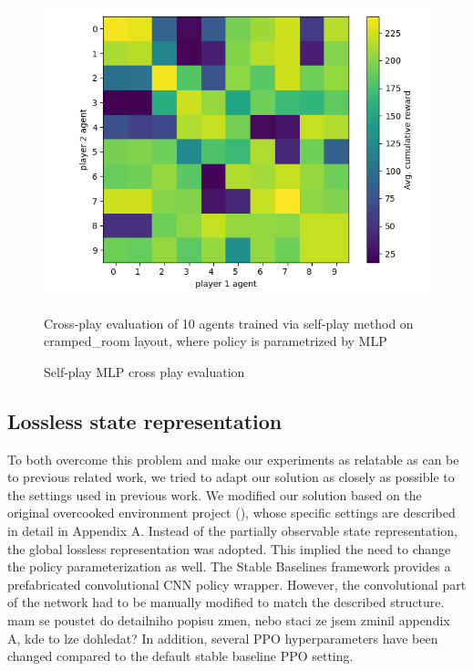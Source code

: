 \begin{figure}[!ht]
    \centering
    \includegraphics*[width=13cm]{../img/MLP_OFF_DIAG_TEST.png}
    \caption{Self-play MLP cross play evaluation}
    \label{MLPSPCrossPlay}
    \medskip
    \small 
    Cross-play evaluation of 10 agents trained via self-play method on cramped\_room layout, where policy is parametrized by MLP

\end{figure}

\subsection*{Lossless state representation}
To both overcome this problem and make our experiments as relatable as can be to previous related work, we tried to adapt our solution as closely as possible to the settings used in previous work.
We modified our solution based on the original overcooked environment project (\cite{carroll2020utility}), whose specific settings are described in detail in Appendix A.
Instead of the partially observable state representation, the global lossless representation was adopted.
This implied the need to change the policy parameterization as well.
The Stable Baselines framework provides a prefabricated convolutional CNN policy wrapper.
However, the convolutional part of the network had to be manually modified to match the described structure. {\color{blue} mam se poustet do detailniho popisu zmen, nebo staci ze jsem zminil appendix A, kde to lze dohledat?}
In addition, several PPO hyperparameters have been changed compared to the default stable baseline PPO setting.


